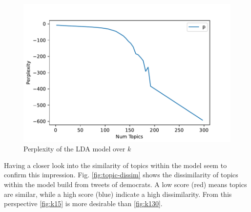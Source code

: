 \documentclass[sigconf, nonacm]{acmart}
\begin{document}
\begin{figure}
	\centering
	\includegraphics[width=\linewidth]{figures/topic_count}
	\caption{Perplexity of the LDA model over $k$}
	\label{fig:topiccount}
\end{figure}

Having a closer look into the similarity of topics within the model seem to confirm this impression. Fig. \ref{fig:topic-dissim} shows the dissimilarity of topics within the model build from tweets of democrats. A low score (red) means topics are similar, while a high score (blue) indicate a high dissimilarity. From this perspective \ref{fig:k15} is more desirable than \ref{fig:k130}.
\end{document}
